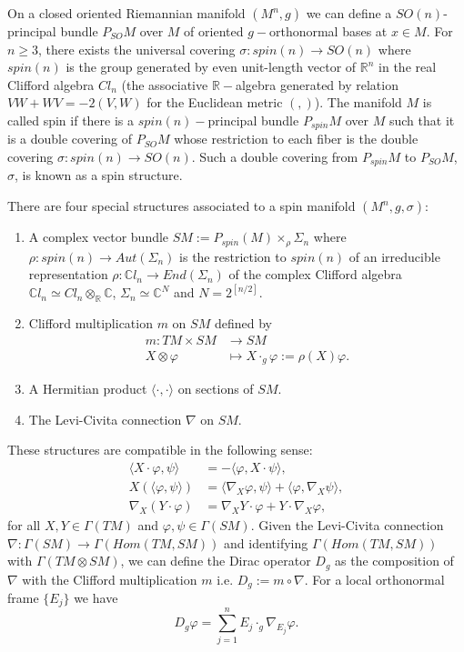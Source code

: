 \documentclass[11pt]{amsart}
\theoremstyle{plain}
\numberwithin{equation}{section}
\theoremstyle{plain}
\begin{document}
On a closed oriented Riemannian manifold $(M^n,g)$ we can define a $SO(n)$-principal bundle $P_{SO}M$ over $M$ of oriented $g-$orthonormal bases at $x\in M$. For $n\geq 3$, there exists the universal covering $\sigma:spin(n)\rightarrow SO(n)$ where $spin(n)$ is the group generated by even unit-length vector of $\mathbb{R}^n$ in the real Clifford algebra $Cl_n$ (the associative $\mathbb{R}-$algebra generated by relation $VW+WV=-2( V,W)$ for the Euclidean metric $(,)$). The manifold $M$ is called spin if there is a $spin(n)-$principal bundle $P_{spin}M$ over $M$ such that it is a double covering of $P_{SO}M$ whose restriction to each fiber is 
the double covering $\sigma:spin(n)\rightarrow SO(n)$. Such a double covering from $P_{spin}M$ to $P_{SO}M$, $\sigma$, is 
known as a spin structure. 

\medskip

There are  four special structures associated to a spin manifold $(M^n,g,\sigma)$:
\begin{enumerate}
\item A complex vector bundle $SM:=P_{spin}(M)\times_{\rho}\Sigma_n$ where $\rho:spin(n)\rightarrow Aut(\Sigma_n)$ is the restriction to $spin(n)$ of an irreducible representation $\rho:\mathbb{C}l_n\rightarrow End(\Sigma_n) $ of the complex Clifford algebra $\mathbb{C}l_n\simeq Cl_n\otimes_{\mathbb{R}} \mathbb{C}$,  $\Sigma_n\simeq\mathbb{C}^N$ and $N=2^{[n/2]}$.
\item  Clifford multiplication $m$ on $SM$ defined by
\begin{align*}
m:TM\times SM&\rightarrow SM\\
X\otimes\varphi&\mapsto X\cdot_g\varphi:=\rho(X)\varphi.
\end{align*} 
\item A Hermitian product $\langle\cdot,\cdot\rangle$ on sections of $SM$.

\item The Levi-Civita connection $\nabla$ on $SM$.
\end{enumerate}

These structures are compatible in the following sense:
\begin{align*}
\langle X\cdot\varphi,\psi\rangle&=-\langle\varphi,X\cdot\psi\rangle, \\
X(\langle\varphi,\psi\rangle)&=\langle\nabla_X\varphi,\psi\rangle+\langle\varphi,\nabla_X\psi\rangle,\\
\nabla_X(Y\cdot\varphi)&=\nabla_XY\cdot\varphi+Y\cdot\nabla_X\varphi,
\end{align*}
for all $X,Y\in\Gamma(TM)$ and $\varphi,\psi\in\Gamma(SM)$.
Given the Levi-Civita  connection $\nabla:\Gamma(SM)\rightarrow\Gamma(Hom(TM,SM))$ and identifying $\Gamma(Hom(TM,SM))$ with $\Gamma(TM\otimes SM)$, we can define the Dirac operator $D_g$ as the composition of $\nabla$ with the Clifford multiplication $m$ i.e. $D_g:=m\circ \nabla$. For a local orthonormal frame $\{E_j\}$ we have $$D_g\varphi=\sum\limits_{j=1}^nE_j\cdot_g\nabla_{E_j}\varphi.$$
\end{document}
